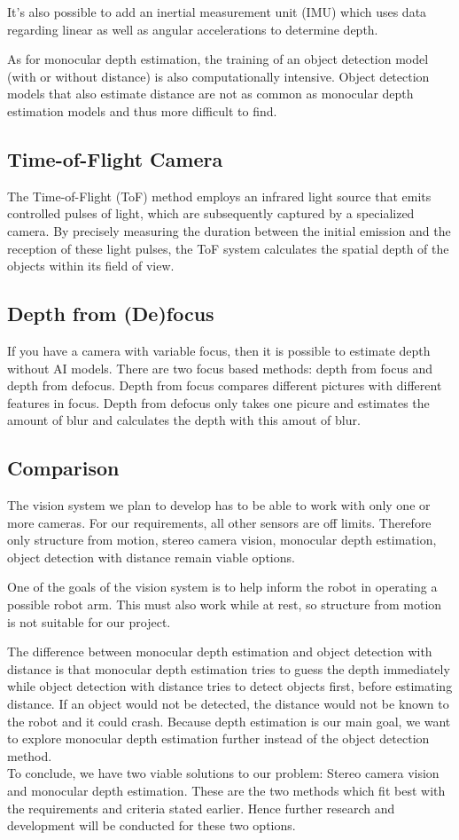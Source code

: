 \documentclass{article}[a4paper]
\begin{document}
It's also possible to add an inertial measurement unit (IMU) which uses data regarding linear as well as angular accelerations to determine depth.

As for monocular depth estimation, the training of an object detection model (with or without distance) is also computationally intensive. Object detection models that also estimate distance are not as common as monocular depth estimation models and thus more difficult to find.

\subsection{Time-of-Flight Camera}
The Time-of-Flight (ToF) method employs an infrared light source that emits controlled pulses of light, which are subsequently captured by a specialized camera. By precisely measuring the duration between the initial emission and the reception of these light pulses, the ToF system calculates the spatial depth of the objects within its field of view.

\subsection{Depth from (De)focus}
If you have a camera with variable focus, then it is possible to estimate depth without AI models. There are two focus based methods: depth from focus and depth from defocus. Depth from focus compares different pictures with different features in focus. Depth from defocus only takes one picure and estimates the amount of blur and calculates the depth with this amout of blur.

\subsection{Comparison}

The vision system we plan to develop has to be able to work with only one or more cameras. For our requirements, all other sensors are off limits. Therefore only structure from motion, stereo camera vision, monocular depth estimation, object detection with distance remain viable options.

One of the goals of the vision system is to help inform the robot in operating a possible robot arm. This must also work while at rest, so structure from motion is not suitable for our project.

The difference between monocular depth estimation and object detection with distance is that monocular depth estimation tries to guess the depth immediately while object detection with distance tries to detect objects first, before estimating distance. If an object would not be detected, the distance would not be known to the robot and it could crash. Because depth estimation is our main goal, we want to explore monocular depth estimation further instead of the object detection method.
\\
To conclude, we have two viable solutions to our problem: Stereo camera vision and monocular depth estimation. These are the two methods which fit best with the requirements and criteria stated earlier. Hence further research and development will be conducted for these two options.
\end{document}
